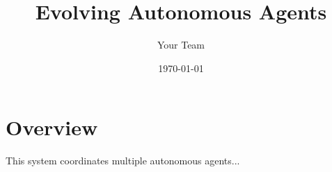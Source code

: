 \documentclass{article}
\title{Evolving Autonomous Agents}
\author{Your Team}
\date{\today}
\begin{document}
\maketitle
\section{Overview}
This system coordinates multiple autonomous agents...
\end{document}
